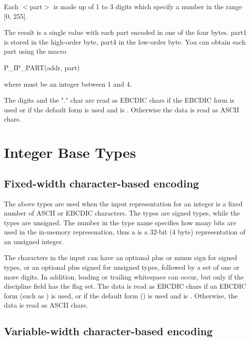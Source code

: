 Each $<$part$>$ is made up of 1 to 3 digits which specify a number
in the range [0, 255].

The result is a single  value with each part encoded in one
of the four bytes.  part1 is stored in the high-order byte, part4
in the low-order byte.  You can obtain each part using the macro

\begin{centercode}
  P\_IP\_PART(addr, part)
\end{centercode}
where  must be an integer between 1 and 4.

The digits and the "." char are read as EBCDIC chars if the EBCDIC
form is used or if the default form is used and
 is .  Otherwise the data is
read as ASCII chars.

\section{Integer Base Types}

\subsection{Fixed-width character-based encoding}

\aedBegin{}
\aedEnd{}

The above types are used when the input representation for an integer
is a fixed number of ASCII or EBCDIC characters.  The  types are
signed types, while the  types are unsigned.  The number in the
type name specifies how many bits are used in the in-memory
represenation, thus a  is a 32-bit (4 byte) representation of
an unsigned integer.

The characters in the input can have an optional plus or minus sign for
signed types, or an optional plus signed for unsigned types, followed
by a set of one or more digits.   In addition, leading or
trailing whitespace can occur, but only if the \pads{} discipline field
 has the  flag set.
The data is read as EBCDIC chars if an EBCDIC
form (such as ) is used, or if the default form () is used and
 is .  Otherwise, the data is
read as ASCII chars.

\subsection{Variable-width character-based encoding}

